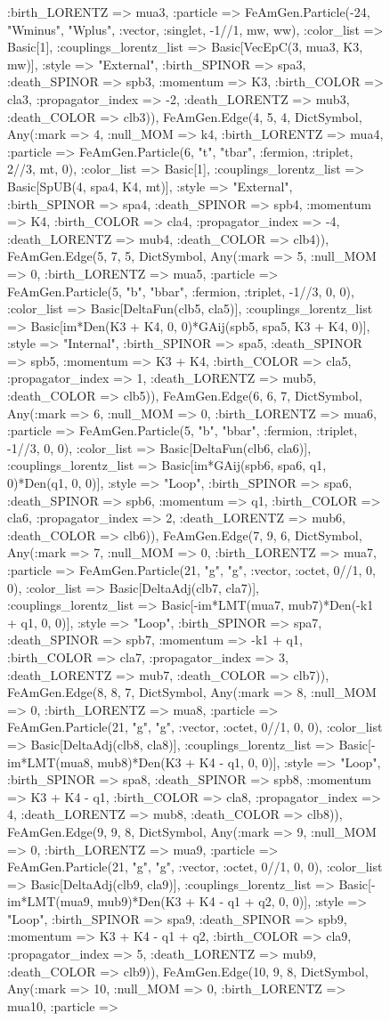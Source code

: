 \documentclass{revtex4}
\begin{document}
\begin{figure}[!htb]
\begin{center}
{:birth_LORENTZ => mua3, :particle => FeAmGen.Particle(-24, "Wminus", "Wplus", :vector, :singlet, -1//1, mw, ww), :color_list => Basic[1], :couplings_lorentz_list => Basic[VecEpC(3, mua3, K3, mw)], :style => "External", :birth_SPINOR => spa3, :death_SPINOR => spb3, :momentum => K3, :birth_COLOR => cla3, :propagator_index => -2, :death_LORENTZ => mub3, :death_COLOR => clb3)), FeAmGen.Edge(4, 5, 4, Dict{Symbol, Any}(:mark => 4, :null_MOM => k4, :birth_LORENTZ => mua4, :particle => FeAmGen.Particle(6, "t", "tbar", :fermion, :triplet, 2//3, mt, 0), :color_list => Basic[1], :couplings_lorentz_list => Basic[SpUB(4, spa4, K4, mt)], :style => "External", :birth_SPINOR => spa4, :death_SPINOR => spb4, :momentum => K4, :birth_COLOR => cla4, :propagator_index => -4, :death_LORENTZ => mub4, :death_COLOR => clb4)), FeAmGen.Edge(5, 7, 5, Dict{Symbol, Any}(:mark => 5, :null_MOM => 0, :birth_LORENTZ => mua5, :particle => FeAmGen.Particle(5, "b", "bbar", :fermion, :triplet, -1//3, 0, 0), :color_list => Basic[DeltaFun(clb5, cla5)], :couplings_lorentz_list => Basic[im*Den(K3 + K4, 0, 0)*GAij(spb5, spa5, K3 + K4, 0)], :style => "Internal", :birth_SPINOR => spa5, :death_SPINOR => spb5, :momentum => K3 + K4, :birth_COLOR => cla5, :propagator_index => 1, :death_LORENTZ => mub5, :death_COLOR => clb5)), FeAmGen.Edge(6, 6, 7, Dict{Symbol, Any}(:mark => 6, :null_MOM => 0, :birth_LORENTZ => mua6, :particle => FeAmGen.Particle(5, "b", "bbar", :fermion, :triplet, -1//3, 0, 0), :color_list => Basic[DeltaFun(clb6, cla6)], :couplings_lorentz_list => Basic[im*GAij(spb6, spa6, q1, 0)*Den(q1, 0, 0)], :style => "Loop", :birth_SPINOR => spa6, :death_SPINOR => spb6, :momentum => q1, :birth_COLOR => cla6, :propagator_index => 2, :death_LORENTZ => mub6, :death_COLOR => clb6)), FeAmGen.Edge(7, 9, 6, Dict{Symbol, Any}(:mark => 7, :null_MOM => 0, :birth_LORENTZ => mua7, :particle => FeAmGen.Particle(21, "g", "g", :vector, :octet, 0//1, 0, 0), :color_list => Basic[DeltaAdj(clb7, cla7)], :couplings_lorentz_list => Basic[-im*LMT(mua7, mub7)*Den(-k1 + q1, 0, 0)], :style => "Loop", :birth_SPINOR => spa7, :death_SPINOR => spb7, :momentum => -k1 + q1, :birth_COLOR => cla7, :propagator_index => 3, :death_LORENTZ => mub7, :death_COLOR => clb7)), FeAmGen.Edge(8, 8, 7, Dict{Symbol, Any}(:mark => 8, :null_MOM => 0, :birth_LORENTZ => mua8, :particle => FeAmGen.Particle(21, "g", "g", :vector, :octet, 0//1, 0, 0), :color_list => Basic[DeltaAdj(clb8, cla8)], :couplings_lorentz_list => Basic[-im*LMT(mua8, mub8)*Den(K3 + K4 - q1, 0, 0)], :style => "Loop", :birth_SPINOR => spa8, :death_SPINOR => spb8, :momentum => K3 + K4 - q1, :birth_COLOR => cla8, :propagator_index => 4, :death_LORENTZ => mub8, :death_COLOR => clb8)), FeAmGen.Edge(9, 9, 8, Dict{Symbol, Any}(:mark => 9, :null_MOM => 0, :birth_LORENTZ => mua9, :particle => FeAmGen.Particle(21, "g", "g", :vector, :octet, 0//1, 0, 0), :color_list => Basic[DeltaAdj(clb9, cla9)], :couplings_lorentz_list => Basic[-im*LMT(mua9, mub9)*Den(K3 + K4 - q1 + q2, 0, 0)], :style => "Loop", :birth_SPINOR => spa9, :death_SPINOR => spb9, :momentum => K3 + K4 - q1 + q2, :birth_COLOR => cla9, :propagator_index => 5, :death_LORENTZ => mub9, :death_COLOR => clb9)), FeAmGen.Edge(10, 9, 8, Dict{Symbol, Any}(:mark => 10, :null_MOM => 0, :birth_LORENTZ => mua10, :particle => }
\end{center}
\end{figure}
\end{document}
